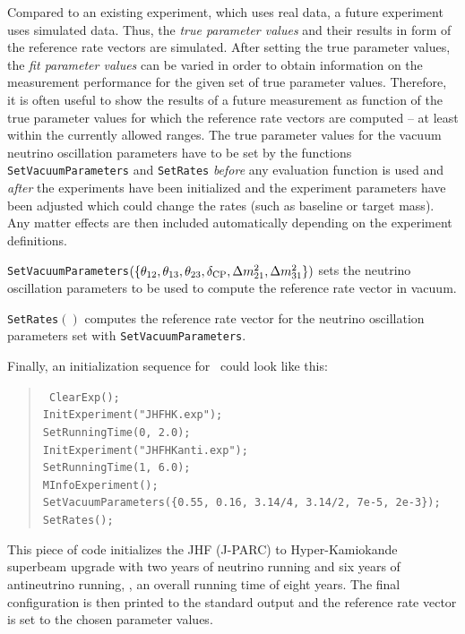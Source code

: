 Compared to an existing experiment, which uses real data, a future experiment uses simulated data. Thus, the {\em true parameter values} and their results in form of the reference rate vectors are simulated. After setting the true parameter values, the {\em fit parameter values} can be varied in order to obtain information on the measurement performance for the given set of true parameter values. Therefore, it is often useful to show the results of a future measurement as function of the true parameter values for which the reference rate vectors are computed -- at least within the currently allowed ranges. The true parameter values for the vacuum neutrino oscillation parameters have to be set by the functions {\tt SetVacuumParameters} and {\tt SetRates} {\em before} any evaluation function is used and {\em after} the experiments have been initialized and the experiment parameters have been adjusted which could change the rates (such as baseline or target mass). Any matter effects are then included automatically depending on the experiment definitions.
\begin{function}
{\tt SetVacuumParameters}$(\{\theta_{12}, \theta_{13}, \theta_{23}, \delta_{\mathrm{CP}} , \Delta m_{21}^2 , \Delta m_{31}^2 \})$ sets the neutrino oscillation parameters to be used to compute the reference rate vector in vacuum.
\end{function}
\begin{function}
{\tt SetRates}$( )$ computes the reference rate vector for the neutrino oscillation parameters set with {\tt SetVacuumParameters}. 
\end{function}
Finally, an initialization sequence for \GLOBES\ could look like this:
\begin{quote}
{\tt
ClearExp(); \\
InitExperiment("JHFHK.exp"); \\
SetRunningTime(0, 2.0); \\
InitExperiment("JHFHKanti.exp"); \\
SetRunningTime(1, 6.0);\\
MInfoExperiment(); \\
SetVacuumParameters(\{0.55, 0.16, 3.14/4, 3.14/2, 7e-5, 2e-3\}); \\
SetRates();
} 
\end{quote}
This piece of code initializes the JHF (J-PARC) to Hyper-Kamiokande superbeam upgrade with two years of neutrino running and six years of antineutrino running, \ie, an overall running time of eight years. The final configuration is then printed to the standard output and the reference rate vector is set to the chosen parameter values.

